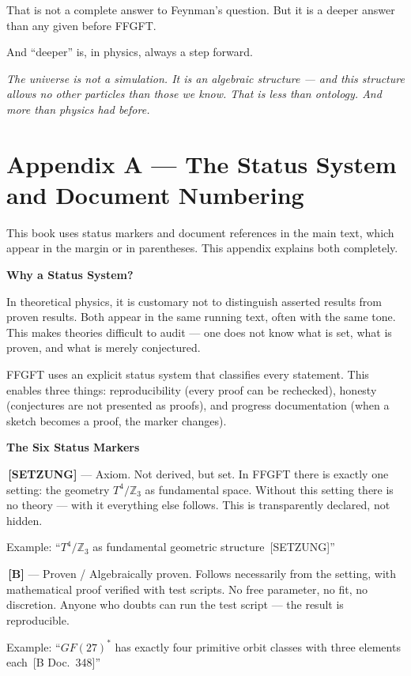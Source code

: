 \documentclass[11pt,oneside]{book}
\newcommand{\status}[1]{\penalty10000\,{\scriptsize\textcolor{gray!60}{[#1]}}}
\begin{document}
That is not a complete answer to Feynman's question. But it is a deeper
answer than any given before FFGFT.

And \enquote{deeper} is, in physics, always a step forward.


\textit{The universe is not a simulation. It is an algebraic structure —
and this structure allows no other particles than those we know.
That is less than ontology. And more than physics had before.}


\chapter*{Appendix A — The Status System and Document Numbering}

This book uses status markers and document references in the main text,
which appear in the margin or in parentheses. This appendix explains both
completely.

\textbf{Why a Status System?}

In theoretical physics, it is customary not to distinguish asserted results
from proven results. Both appear in the same running text, often with the
same tone. This makes theories difficult to audit — one does not know what
is set, what is proven, and what is merely conjectured.

FFGFT uses an explicit status system that classifies every statement. This
enables three things: reproducibility (every proof can be rechecked),
honesty (conjectures are not presented as proofs), and progress
documentation (when a sketch becomes a proof, the marker changes).

\textbf{The Six Status Markers}

\textbf{\status{SETZUNG}} — Axiom. Not derived, but set. In FFGFT there is
exactly one setting: the geometry $T^4/\mathbb{Z}_3$ as fundamental space. Without
this setting there is no theory — with it everything else follows. This is
transparently declared, not hidden.

Example: \enquote{$T^4/\mathbb{Z}_3$ as fundamental geometric structure \status{SETZUNG}}

\textbf{\status{B}} — Proven / Algebraically proven. Follows necessarily from the
setting, with mathematical proof verified with test scripts. No free
parameter, no fit, no discretion. Anyone who doubts can run the test script —
the result is reproducible.

Example: \enquote{$GF(27)^*$ has exactly four primitive orbit classes with three
elements each \status{B Doc.~348}}
\end{document}
